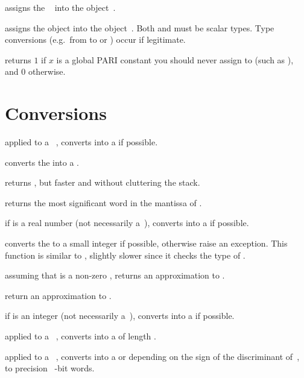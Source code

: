  assigns the ~ into the
object~.

 assigns the object  into the
object~. Both  and  must be scalar types. Type
conversions (e.g.~from  to  or ) occur if
legitimate.

 returns $1$ if $x$ is a global PARI
constant you should never assign to (such as ), and $0$
otherwise.

\section{Conversions}


 applied to a ~, converts 
into a  if possible.

 converts the   into a
.

 returns , but
faster and without cluttering the stack.

 returns the most significant word
in the mantissa of .

 if  is a real number (not necessarily
a~), converts  into a  if possible.

 converts the   to a small
integer if possible, otherwise raise an exception. This function
is similar to , slightly slower since it checks the type of .

 assuming that  is a non-zero ,
returns an approximation to .

 return an approximation to .

 if  is an integer (not necessarily
a~), converts  into a  if possible.

 applied to a ~, converts
 into a  of length .

 applied to a ~, converts
 into a  or  depending on the sign of the
discriminant of~, to precision \hbox{ \B-bit} words.

